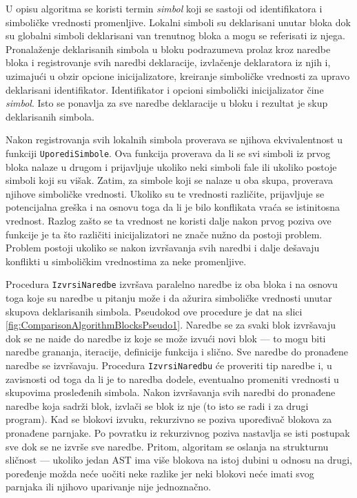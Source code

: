 U opisu algoritma se koristi termin \emph{simbol} koji se sastoji od identifikatora i simboličke vrednosti promenljive. Lokalni simboli su deklarisani unutar bloka dok su globalni simboli deklarisani van trenutnog bloka a mogu se referisati iz njega. Pronalaženje deklarisanih simbola u bloku podrazumeva prolaz kroz naredbe bloka i registrovanje svih naredbi deklaracije, izvlačenje deklaratora iz njih i, uzimajući u obzir opcione inicijalizatore, kreiranje simboličke vrednosti za upravo deklarisani identifikator. Identifikator i opcioni simbolički inicijalizator čine \emph{simbol}. Isto se ponavlja za sve naredbe deklaracije u bloku i rezultat je skup deklarisanih simbola.

Nakon registrovanja svih lokalnih simbola proverava se njihova ekvivalentnost u funkciji \texttt{UporediSimbole}. Ova funkcija proverava da li se svi simboli iz prvog bloka nalaze u drugom i prijavljuje ukoliko neki simboli fale ili ukoliko postoje simboli koji su višak. Zatim, za simbole koji se nalaze u oba skupa, proverava njihove simboličke vrednosti. Ukoliko su te vrednosti različite, prijavljuje se potencijalna greška i na osnovu toga da li je bilo konflikata vraća se istinitosna vrednost. Razlog zašto se ta vrednost ne koristi dalje nakon prvog poziva ove funkcije je ta što različiti inicijalizatori ne znače nužno da postoji problem. Problem postoji ukoliko se nakon izvršavanja svih naredbi i dalje dešavaju konflikti u simboličkim vrednostima za neke promenljive. 

Procedura \texttt{IzvrsiNaredbe} izvršava paralelno naredbe iz oba bloka i na osnovu toga koje su naredbe u pitanju može i da ažurira simboličke vrednosti unutar skupova deklarisanih simbola. Pseudokod ove procedure je dat na slici \ref{fig:ComparisonAlgorithmBlocksPseudo1}. Naredbe se za svaki blok izvršavaju dok se ne naiđe do naredbe iz koje se može izvući novi blok --- to mogu biti naredbe grananja, iteracije, definicije funkcija i slično. Sve naredbe do pronađene naredbe se izvršavaju. Procedura \texttt{IzvrsiNaredbu} će proveriti tip naredbe i, u zavisnosti od toga da li je to naredba dodele, eventualno promeniti vrednosti u skupovima prosleđenih simbola. Nakon izvršavanja svih naredbi do pronađene naredbe koja sadrži blok, izvlači se blok iz nje (to isto se radi i za drugi program). Kad se blokovi izvuku, rekurzivno se poziva upoređivač blokova za pronađene parnjake. Po povratku iz rekurzivnog poziva nastavlja se isti postupak sve dok se ne izvrše sve naredbe. Pritom, algoritam se oslanja na strukturnu sličnost --- ukoliko jedan AST ima više blokova na istoj dubini u odnosu na drugi, poređenje možda neće uočiti neke razlike jer neki blokovi neće imati svog parnjaka ili njihovo uparivanje nije jednoznačno. 

